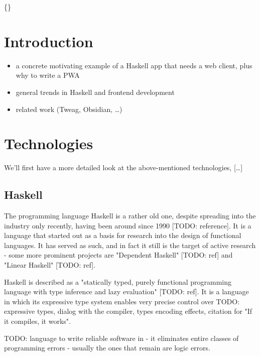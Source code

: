 \documentclass[english,odsaz]{fitthesis}
\date{\today}
\title{}
\begin{document}
\maketitle
\setlength{\parskip}{0pt}
\{\hypersetup{hidelinks}\tableofcontents\}
\iftotalfigures\listoffigures\fi
\iftotaltables\listoftables\fi
\iftwoside\cleardoublepage\fi
\setlength{\parskip}{0.5\bigskipamount}

\chapter{Introduction}
\label{sec:orgb206161}
\begin{itemize}
\item a concrete motivating example of a Haskell app that needs a web client, plus
why to write a PWA
\item general trends in Haskell and frontend development
\item related work (Tweag, Obsidian, \ldots{})
\end{itemize}

\chapter{Technologies}
\label{sec:orgc801d41}
We'll first have a more detailed look at the above-mentioned technologies, [\ldots{}]

\section{Haskell}
\label{sec:org750025f}
The programming language Haskell is a rather old one, despite spreading into the
industry only recently, having been around since 1990 [TODO: reference]. It is a
language that started out as a basis for research into the design of functional
languages. It has served as such, and in fact it still is the target of active
research - some more prominent projects are "Dependent Haskell" [TODO: ref] and
"Linear Haskell" [TODO: ref].

Haskell is described as a "statically typed, purely functional programming
language with type inference and lazy evaluation" [TODO: ref]. It is a language
in which its expressive type system enables very precise control over TODO:
expressive types, dialog with the compiler, types encoding effects, citation for
"If it compiles, it works".

TODO: language to write reliable software in - it eliminates entire classes of
programming errors - usually the ones that remain are logic errors.
\end{document}

